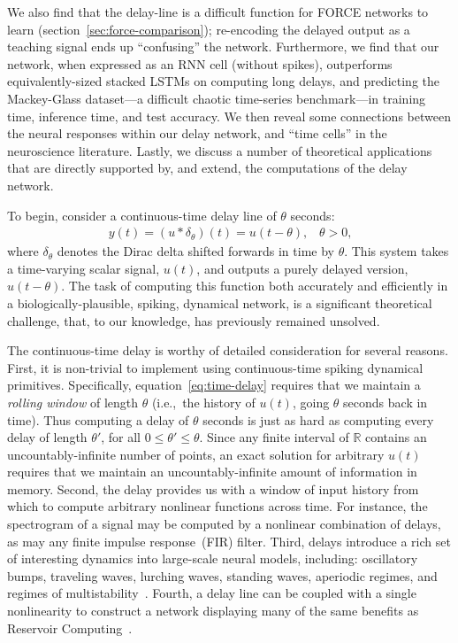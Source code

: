 We also find that the delay-line is a difficult function for FORCE networks to learn (section~\ref{sec:force-comparison}); re-encoding the delayed output as a teaching signal ends up ``confusing'' the network.
Furthermore, we find that our network, when expressed as an RNN cell (without spikes), outperforms equivalently-sized stacked LSTMs on computing long delays, and predicting the Mackey-Glass dataset---a difficult chaotic time-series benchmark---in training time, inference time, and test accuracy.
We then reveal some connections between the neural responses within our delay network, and ``time cells'' in the neuroscience literature.
Lastly, we discuss a number of theoretical applications that are directly supported by, and extend, the computations of the delay network.

To begin, consider a continuous-time delay line of $\theta$ seconds:
\begin{align} \label{eq:time-delay}
y(t) = (u \ast \delta_{\theta})(t) = u(t - \theta)\text{,} \quad \theta > 0 \text{,}
\end{align}
where $\delta_{\theta}$ denotes the Dirac delta shifted forwards in time by $\theta$.
This system takes a time-varying scalar signal, $u(t)$, and outputs a purely delayed version, $u(t - \theta)$.
The task of computing this function both accurately and efficiently in a biologically-plausible, spiking, dynamical network, is a significant theoretical challenge, that, to our knowledge, has previously remained unsolved.

The continuous-time delay is worthy of detailed consideration for several reasons.
First, it is non-trivial to implement using continuous-time spiking dynamical primitives.
Specifically, equation~\ref{eq:time-delay} requires that we maintain a \emph{rolling window} of length $\theta$ (i.e.,~the history of $u(t)$, going $\theta$ seconds back in time).
Thus computing a delay of $\theta$ seconds is just as hard as computing every delay of length $\theta'$, for all $0 \le \theta' \le \theta$.
Since any finite interval of $\mathbb{R}$ contains an uncountably-infinite number of points, an exact solution for arbitrary $u(t)$ requires that we maintain an uncountably-infinite amount of information in memory.
Second, the delay provides us with a window of input history from which to compute arbitrary nonlinear functions across time.
For instance, the spectrogram of a signal may be computed by a nonlinear combination of delays, as may any finite impulse response~(FIR) filter.
Third, delays introduce a rich set of interesting dynamics into large-scale neural models, including: oscillatory bumps, traveling waves, lurching waves, standing waves, aperiodic regimes, and regimes of multistability~\citep{roxin2005role}.
Fourth, a delay line can be coupled with a single nonlinearity to construct a network displaying many of the same benefits as Reservoir Computing~\citep{appeltant2011information, bai2018dfr}.

